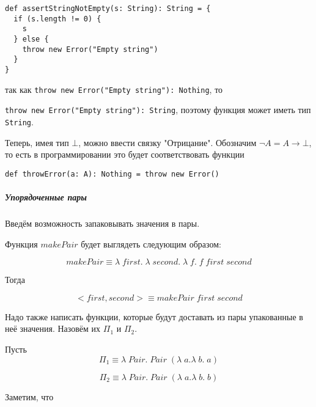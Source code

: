 \begin{verbatim}
def assertStringNotEmpty(s: String): String = {
  if (s.length != 0) {
    s
  } else {
    throw new Error("Empty string")
  }
}
\end{verbatim}

так как \texttt{throw new Error("Empty string"): Nothing}, то 

\texttt{throw new Error("Empty string"): String}, поэтому функция может иметь тип \texttt{String}.

Теперь, имея тип $\bot$, можно ввести связку "Отрицание". Обозначим $\neg A = A \rightarrow \bot$, то есть в программировании это будет соответствовать функции

\begin{verbatim}
def throwError(a: A): Nothing = throw new Error()
\end{verbatim}

\subparagraph{Упорядоченные пары}

Введём возможность запаковывать значения в пары.

Функция $makePair$ будет выглядеть следующим образом:

$$makePair \equiv \lambda \; first. \; \lambda \; second. \; \lambda \; f. \; f \; first \; second$$\newline

Тогда 

$$<first, second> \equiv makePair \; first \; second$$

Надо также написать функции, которые будут доставать из пары упакованные в неё значения. Назовём их $\Pi_1$ и $\Pi_2$. 

Пусть 
$$\Pi_1 \equiv \lambda \; Pair. \; Pair \; (\lambda \; a. \lambda \; b. \; a)$$

$$\Pi_2 \equiv \lambda \; Pair. \; Pair \; (\lambda \; a. \lambda \; b. \; b)$$

Заметим, что 

